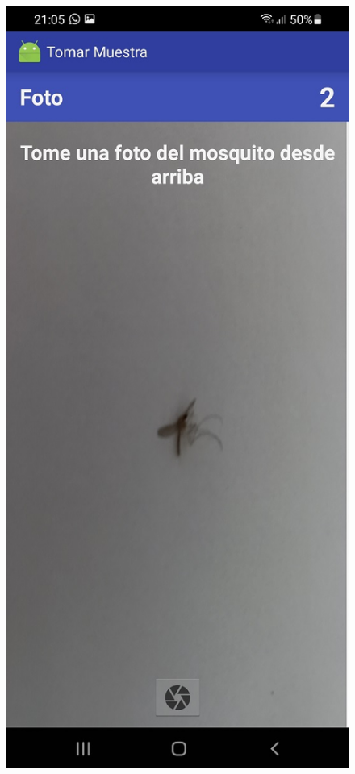 \begin{figure}[H]
\begin{center}
   \includegraphics[scale=0.3]{05-implementacion/app_generada_ejemplo3.jpg}   

\end{center}
\end{figure}
